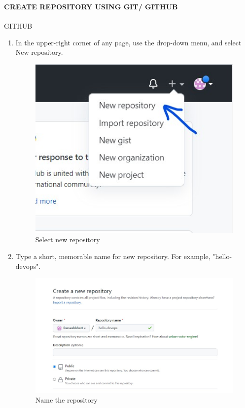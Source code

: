 \documentclass[12pt]{article}
\begin{document}
\textbf{\uppercase {Create Repository using GIT/ GITHUB}} \\
\vspace{0.6\baselineskip} \\
\noindent
GITHUB
\vspace{0.6\baselineskip}
\begin{enumerate}

\item In the upper-right corner of any page, use the drop-down menu, and
select New repository.

\begin{figure}[H]
\centering
\includegraphics[scale=1]{p3(1)}
\caption{Select new repository}
\label{p3(1)}
\vspace{0.6\baselineskip}
\end{figure}


\item Type a short, memorable name for new repository. For example, "hello-devops".

\begin{figure}[H]
\centering
\includegraphics[scale=0.6]{p3two}
\caption{Name the repository}
\label{p3two}
\vspace{0.6\baselineskip}
\end{figure}


\end{enumerate}
\end{document}
